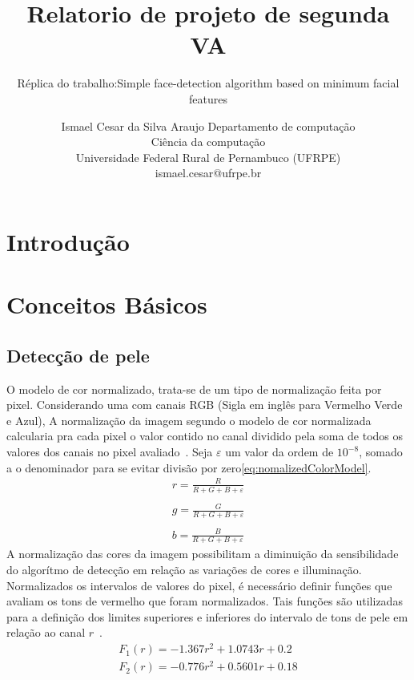 \documentclass[journal,onecolumn]{IEEEtran}
\title{Relatorio de projeto de segunda VA}
\subtitle{Réplica do trabalho:Simple face-detection algorithm based on minimum facial features}
\author{		Ismael Cesar da Silva Araujo
  				Departamento de computação \\
				  Ciência da computação\\
		Universidade Federal Rural de Pernambuco (UFRPE)\\
			ismael.cesar@ufrpe.br}
\date{}
\begin{document}
\maketitle

\section{Introdução}

\section{Conceitos Básicos}
	\subsection{Detecção de pele}
	O modelo de cor normalizado, trata-se de um tipo de normalização feita por pixel. 
	Considerando uma com canais RGB (Sigla em inglês para Vermelho Verde e Azul), 
	A normalização da imagem segundo o modelo de cor normalizada calcularia pra cada pixel o valor contido no canal dividido pela soma de todos os valores dos canais no pixel avaliado~\cite{chen2007simple,loesdau2017chromatic}. 
	Seja $\varepsilon$ um valor da ordem de $10^{-8}$, somado a o denominador para se evitar divisão por zero\eqref{eq:nomalizedColorModel}.	
	\begin{equation}
		\begin{split}
			r  = \frac{R}{R+G+B+\varepsilon} \\\\
			g  = \frac{G}{R+G+B+\varepsilon} \\\\
			b  = \frac{B}{R+G+B+\varepsilon}
			\label{eq:nomalizedColorModel}
		\end{split}
	\end{equation}		
	A normalização das cores da imagem possibilitam a diminuição da sensibilidade do algorítmo de detecção em relação as variações de cores e illuminação.
	Normalizados os intervalos de valores do pixel, é necessário definir funções que avaliam os tons de vermelho  que foram normalizados.
	Tais funções são utilizadas para a definição dos limites superiores e inferiores do intervalo de tons de pele em relação ao canal $r$~\cite{soriano2000using,chen2007simple}.
	\begin{equation}
		\begin{split}
			F_1(r)  = -1.367r^2 + 1.0743r + 0.2 \\
			F_2(r)  = -0.776r^2 + 0.5601r + 0.18
		\end{split}
	\end{equation}
	
\end{document}
